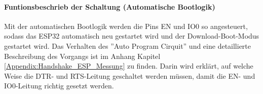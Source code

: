 \paragraph{Funtionsbeschrieb der Schaltung (Automatische Bootlogik)}\mbox{}

Mit der automatischen Bootlogik werden die Pins EN und IO0 so angesteuert, sodass das ESP32 automatisch neu gestartet wird und der Download-Boot-Modus gestartet wird. Das Verhalten des ''Auto Program Cirquit'' und eine detaillierte Beschreibung des Vorgangs ist im Anhang Kapitel \ref{Appendix:Handshake_ESP_Messung} zu finden. Darin wird erklärt, auf welche Weise die DTR- und RTS-Leitung geschaltet werden müssen, damit die EN- und IO0-Leitung richtig gesetzt werden.